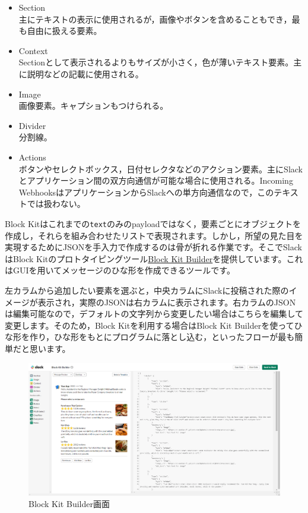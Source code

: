 \documentclass[uplatex,a4j]{jsarticle}
\begin{document}
\begin{itemize}
\item Section \\
主にテキストの表示に使用されるが，画像やボタンを含めることもでき，最も自由に扱える要素。
\item Context\\
Sectionとして表示されるよりもサイズが小さく，色が薄いテキスト要素。主に説明などの記載に使用される。
\item Image\\
画像要素。キャプションもつけられる。
\item Divider\\
分割線。
\item Actions\\
ボタンやセレクトボックス，日付セレクタなどのアクション要素。主にSlackとアプリケーション間の双方向通信が可能な場合に使用される。Incoming WebhooksはアプリケーションからSlackへの単方向通信なので，このテキストでは扱わない。
\end{itemize}

Block Kitはこれまでの\verb|text|のみのpayloadではなく，要素ごとにオブジェクトを作成し，それらを組み合わせたリストで表現されます。しかし，所望の見た目を実現するためにJSONを手入力で作成するのは骨が折れる作業です。そこでSlackはBlock Kitのプロトタイピングツール\href{https://api.slack.com/tools/block-kit-builder}{Block Kit Builder}を提供しています。これはGUIを用いてメッセージのひな形を作成できるツールです。


左カラムから追加したい要素を選ぶと，中央カラムにSlackに投稿された際のイメージが表示され，実際のJSONは右カラムに表示されます。右カラムのJSONは編集可能なので，デフォルトの文字列から変更したい場合はこちらを編集して変更します。そのため，Block Kitを利用する場合はBlock Kit Builderを使ってひな形を作り，ひな形をもとにプログラムに落とし込む，といったフローが最も簡単だと思います。

\begin{figure}[H]
 \centering
 \includegraphics[keepaspectratio, scale=0.35]{images/block_kit_builder.png}
 \caption{Block Kit Builder画面}
 \label{fig:block_kit_builder}
\end{figure}
\end{document}
